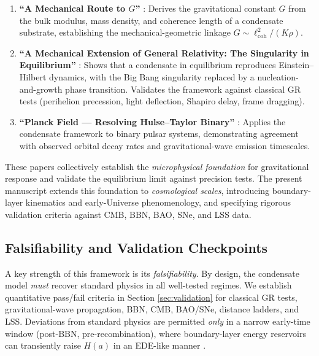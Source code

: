 \documentclass[11pt,a4paper]{article}
\theoremstyle{definition}
\begin{document}
\begin{enumerate}[leftmargin=2.2em]
  \item \textbf{``A Mechanical Route to $G$''} \cite{SkavbergMechG2025}: Derives the gravitational constant $G$ from the bulk modulus, mass density, and coherence length of a condensate substrate, establishing the mechanical-geometric linkage $G \sim \ell_{\mathrm{coh}}^2 / (K \rho)$.
  \item \textbf{``A Mechanical Extension of General Relativity: The Singularity in Equilibrium''} \cite{SkavbergMechGR2025}: Shows that a condensate in equilibrium reproduces Einstein--Hilbert dynamics, with the Big Bang singularity replaced by a nucleation-and-growth phase transition. Validates the framework against classical GR tests (perihelion precession, light deflection, Shapiro delay, frame dragging).
  \item \textbf{``Planck Field --- Resolving Hulse--Taylor Binary''} \cite{SkavbergPlanckField2025}: Applies the condensate framework to binary pulsar systems, demonstrating agreement with observed orbital decay rates and gravitational-wave emission timescales.
\end{enumerate}

These papers collectively establish the \emph{microphysical foundation} for gravitational response and validate the equilibrium limit against precision tests. The present manuscript extends this foundation to \emph{cosmological scales}, introducing boundary-layer kinematics and early-Universe phenomenology, and specifying rigorous validation criteria against CMB, BBN, BAO, SNe, and LSS data.

\subsection{Falsifiability and Validation Checkpoints}
\label{sec:falsifiability}

A key strength of this framework is its \emph{falsifiability}. By design, the condensate model \emph{must} recover standard physics in all well-tested regimes. We establish quantitative pass/fail criteria in Section \ref{sec:validation} for classical GR tests, gravitational-wave propagation, BBN, CMB, BAO/SNe, distance ladders, and LSS. Deviations from standard physics are permitted \emph{only} in a narrow early-time window (post-BBN, pre-recombination), where boundary-layer energy reservoirs can transiently raise $H(a)$ in an EDE-like manner \cite{Poulin2019,EDEReview2023,PoulinReview2023}.
\end{document}

